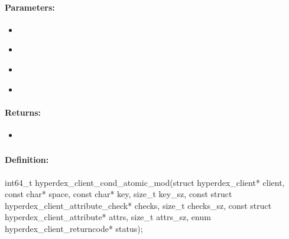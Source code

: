 \paragraph{Parameters:}
\begin{itemize}[noitemsep]
\item {}\\

\item {}\\

\item {}\\

\item {}\\

\end{itemize}

\paragraph{Returns:}
\begin{itemize}[noitemsep]
\item {}\\

\end{itemize}

\pagebreak
\subsubsection{}
\label{api:c:cond_atomic_mod}


\paragraph{Definition:}
\begin{ccode}
int64_t hyperdex_client_cond_atomic_mod(struct hyperdex_client* client,
        const char* space,
        const char* key, size_t key_sz,
        const struct hyperdex_client_attribute_check* checks, size_t checks_sz,
        const struct hyperdex_client_attribute* attrs, size_t attrs_sz,
        enum hyperdex_client_returncode* status);
\end{ccode}

